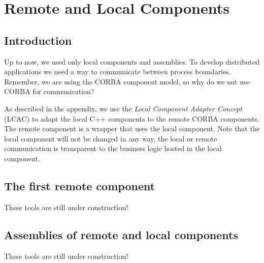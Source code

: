 \chapter{Remote and Local Components}
\begin{flushright}
{\it }
\end{flushright}

\section{Introduction}

Up to now, we used only local components and assemblies. To develop distributed
applications we need a way to communicate between process boundaries. Remember,
we are using the CORBA component model, so why do we not use CORBA for
communication?

As described in the appendix, we use the {\it Local Component Adapter Concept}
(LCAC) to adapt the local C++ components to the remote CORBA components. The
remote component is a wrapper that uses the local component. Note that the local
component will not be changed in any way, the local or remote communication is
transparent to the business logic hosted in the local component.


\section{The first remote component}

These tools are still under construction!



\section{Assemblies of remote and local components}

These tools are still under construction!


